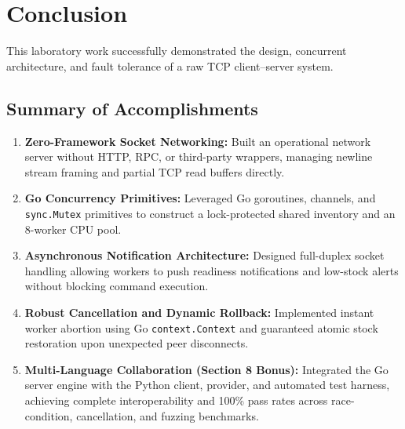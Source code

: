 \documentclass{labreport}
\begin{document}
\section{Conclusion}

This laboratory work successfully demonstrated the design, concurrent architecture, and fault tolerance of a raw TCP client--server system.

\subsection{Summary of Accomplishments}
\begin{enumerate}
    \item \textbf{Zero-Framework Socket Networking:} Built an operational network server without HTTP, RPC, or third-party wrappers, managing newline stream framing and partial TCP read buffers directly.
    \item \textbf{Go Concurrency Primitives:} Leveraged Go goroutines, channels, and \texttt{sync.Mutex} primitives to construct a lock-protected shared inventory and an 8-worker CPU pool.
    \item \textbf{Asynchronous Notification Architecture:} Designed full-duplex socket handling allowing workers to push readiness notifications and low-stock alerts without blocking command execution.
    \item \textbf{Robust Cancellation and Dynamic Rollback:} Implemented instant worker abortion using Go \texttt{context.Context} and guaranteed atomic stock restoration upon unexpected peer disconnects.
    \item \textbf{Multi-Language Collaboration (Section 8 Bonus):} Integrated the Go server engine with the Python client, provider, and automated test harness, achieving complete interoperability and 100\% pass rates across race-condition, cancellation, and fuzzing benchmarks.
\end{enumerate}
\end{document}
